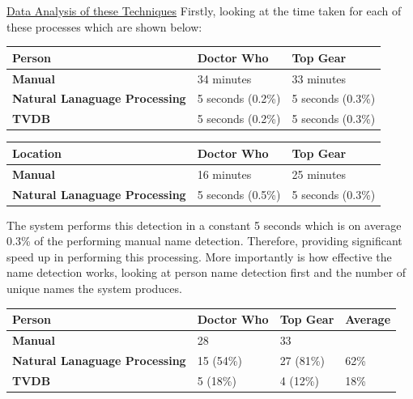 \newpage 

\underline{Data Analysis of these Techniques}
\newline
Firstly, looking at the time taken for each of these processes which are shown below: 
\begin{center}
\begin{tabular}{|p{170pt}|p{110pt}|p{110pt}|}
\hline
\textbf{Person}					&\textbf{Doctor Who}		&\textbf{Top Gear}
\\\hline
\textbf{Manual}					&34 minutes		&33 minutes
\\\hline
\textbf{Natural Lanaguage Processing}	&5 seconds (0.2\%)	&5 seconds (0.3\%)
\\\hline
\textbf{TVDB}					&5 seconds (0.2\%)	&5 seconds (0.3\%)
\\\hline
\end{tabular}
\end{center}

\begin{center}
\begin{tabular}{|p{170pt}|p{110pt}|p{110pt}|}
\hline
\textbf{Location}					&\textbf{Doctor Who}		&\textbf{Top Gear}
\\\hline
\textbf{Manual}					&16 minutes		&25 minutes
\\\hline
\textbf{Natural Lanaguage Processing}	&5 seconds (0.5\%)	&5 seconds (0.3\%)
\\\hline
\end{tabular}
\end{center}

The system performs this detection in a constant 5 seconds which is on average 0.3\% of the performing manual name detection. Therefore, providing significant speed up in performing this processing. More importantly is how effective the name detection works, looking at person name detection first and the number of unique names the system produces.

\begin{center}
\begin{tabular}{|p{170pt}|p{70pt}|p{70pt}|p{70pt}|}
\hline
\textbf{Person}					&\textbf{Doctor Who}	&\textbf{Top Gear}	&\textbf{Average}
\\\hline
\textbf{Manual}					&28			&33			&
\\\hline
\textbf{Natural Lanaguage Processing}	&15 (54\%)	&27 (81\%)	&62\%
\\\hline
\textbf{TVDB}					&5 (18\%)		&4 (12\%)		&18\%
\\\hline
\end{tabular}
\end{center}

